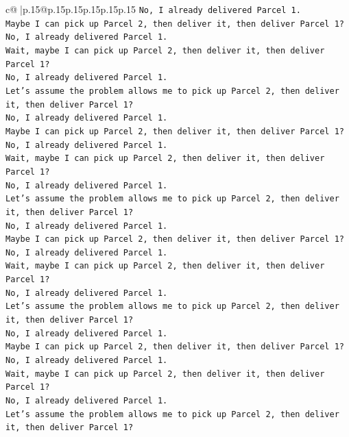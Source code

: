 \documentclass{article}
\begin{document}
{\begin{supertabular}{c@{$\;$}|p{.15\linewidth}@{}p{.15\linewidth}p{.15\linewidth}p{.15\linewidth}p{.15\linewidth}p{.15\linewidth}}
{{{\texttt{No, I already delivered Parcel 1.} \\
\texttt{Maybe I can pick up Parcel 2, then deliver it, then deliver Parcel 1?} \\
\texttt{No, I already delivered Parcel 1.} \\
\texttt{Wait, maybe I can pick up Parcel 2, then deliver it, then deliver Parcel 1?} \\
\texttt{No, I already delivered Parcel 1.} \\
\texttt{Let's assume the problem allows me to pick up Parcel 2, then deliver it, then deliver Parcel 1?} \\
\texttt{No, I already delivered Parcel 1.} \\
\texttt{Maybe I can pick up Parcel 2, then deliver it, then deliver Parcel 1?} \\
\texttt{No, I already delivered Parcel 1.} \\
\texttt{Wait, maybe I can pick up Parcel 2, then deliver it, then deliver Parcel 1?} \\
\texttt{No, I already delivered Parcel 1.} \\
\texttt{Let's assume the problem allows me to pick up Parcel 2, then deliver it, then deliver Parcel 1?} \\
\texttt{No, I already delivered Parcel 1.} \\
\texttt{Maybe I can pick up Parcel 2, then deliver it, then deliver Parcel 1?} \\
\texttt{No, I already delivered Parcel 1.} \\
\texttt{Wait, maybe I can pick up Parcel 2, then deliver it, then deliver Parcel 1?} \\
\texttt{No, I already delivered Parcel 1.} \\
\texttt{Let's assume the problem allows me to pick up Parcel 2, then deliver it, then deliver Parcel 1?} \\
\texttt{No, I already delivered Parcel 1.} \\
\texttt{Maybe I can pick up Parcel 2, then deliver it, then deliver Parcel 1?} \\
\texttt{No, I already delivered Parcel 1.} \\
\texttt{Wait, maybe I can pick up Parcel 2, then deliver it, then deliver Parcel 1?} \\
\texttt{No, I already delivered Parcel 1.} \\
\texttt{Let's assume the problem allows me to pick up Parcel 2, then deliver it, then deliver Parcel 1?} \\
}}}
\end{supertabular}}
\end{document}

